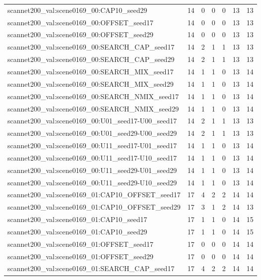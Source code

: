 \begin{table}[t]
\begin{tabular}{lrrrrrr}
scannet200\_val:scene0169\_00:CAP10\_seed29 & 14 & 0 & 0 & 0 & 13 & 13 \\
scannet200\_val:scene0169\_00:OFFSET\_seed17 & 14 & 0 & 0 & 0 & 13 & 13 \\
scannet200\_val:scene0169\_00:OFFSET\_seed29 & 14 & 0 & 0 & 0 & 13 & 13 \\
scannet200\_val:scene0169\_00:SEARCH\_CAP\_seed17 & 14 & 2 & 1 & 1 & 13 & 13 \\
scannet200\_val:scene0169\_00:SEARCH\_CAP\_seed29 & 14 & 2 & 1 & 1 & 13 & 13 \\
scannet200\_val:scene0169\_00:SEARCH\_MIX\_seed17 & 14 & 1 & 1 & 0 & 13 & 14 \\
scannet200\_val:scene0169\_00:SEARCH\_MIX\_seed29 & 14 & 1 & 1 & 0 & 13 & 14 \\
scannet200\_val:scene0169\_00:SEARCH\_NMIX\_seed17 & 14 & 1 & 1 & 0 & 13 & 14 \\
scannet200\_val:scene0169\_00:SEARCH\_NMIX\_seed29 & 14 & 1 & 1 & 0 & 13 & 14 \\
scannet200\_val:scene0169\_00:U01\_seed17-U00\_seed17 & 14 & 2 & 1 & 1 & 13 & 13 \\
scannet200\_val:scene0169\_00:U01\_seed29-U00\_seed29 & 14 & 2 & 1 & 1 & 13 & 13 \\
scannet200\_val:scene0169\_00:U11\_seed17-U01\_seed17 & 14 & 1 & 1 & 0 & 13 & 14 \\
scannet200\_val:scene0169\_00:U11\_seed17-U10\_seed17 & 14 & 1 & 1 & 0 & 13 & 14 \\
scannet200\_val:scene0169\_00:U11\_seed29-U01\_seed29 & 14 & 1 & 1 & 0 & 13 & 14 \\
scannet200\_val:scene0169\_00:U11\_seed29-U10\_seed29 & 14 & 1 & 1 & 0 & 13 & 14 \\
scannet200\_val:scene0169\_01:CAP10\_OFFSET\_seed17 & 17 & 4 & 2 & 2 & 14 & 14 \\
scannet200\_val:scene0169\_01:CAP10\_OFFSET\_seed29 & 17 & 3 & 1 & 2 & 14 & 13 \\
scannet200\_val:scene0169\_01:CAP10\_seed17 & 17 & 1 & 1 & 0 & 14 & 15 \\
scannet200\_val:scene0169\_01:CAP10\_seed29 & 17 & 1 & 1 & 0 & 14 & 15 \\
scannet200\_val:scene0169\_01:OFFSET\_seed17 & 17 & 0 & 0 & 0 & 14 & 14 \\
scannet200\_val:scene0169\_01:OFFSET\_seed29 & 17 & 0 & 0 & 0 & 14 & 14 \\
scannet200\_val:scene0169\_01:SEARCH\_CAP\_seed17 & 17 & 4 & 2 & 2 & 14 & 14 \\

\end{tabular}
\end{table}
